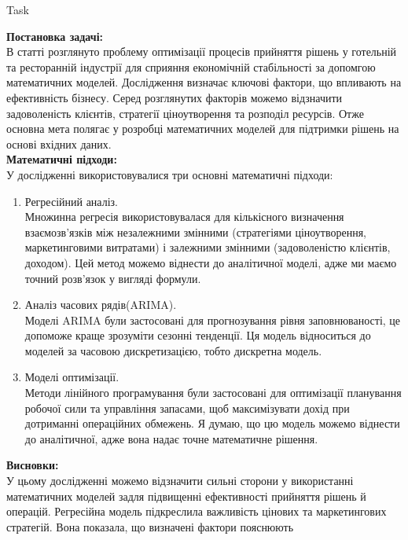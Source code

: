 \documentclass[a4paper,12pt]{article}
\newcommand{\RomanNumeralCaps}[1]{\MakeUppercase{\romannumeral #1}}
\begin{document}
\newpage
    \begin{center}
        \Large{Task \RomanNumeralCaps{1}}
    \end{center}
    \textbf{Постановка задачі:} \\
    В статті розглянуто проблему оптимізації процесів прийняття рішень у готельній та ресторанній індустрії для сприяння 
    економічній стабільності за допомгою математичних моделей.  
    Дослідження визначає ключові фактори, що впливають на ефективність бізнесу. Серед розглянутих факторів можемо відзначити задоволеність 
    клієнтів, стратегії ціноутворення та розподіл ресурсів. Отже основна мета полягає у розробці математичних моделей для підтримки рішень на основі вхідних даних. \\
    \textbf{Математичні підходи:} \\
    У дослідженні використовувалися три основні математичні підходи:
    \begin{enumerate}
        \item Регресійний аналіз. \\
        Множинна регресія використовувалася для кількісного визначення взаємозв’язків між незалежними змінними 
        (стратегіями ціноутворення, маркетинговими витратами) і залежними змінними (задоволеністю клієнтів, доходом).
        Цей метод можемо віднести до аналітичної моделі, адже ми маємо точний розв'язок у вигляді формули.
        \item Аналіз часових рядів(ARIMA). \\
        Моделі ARIMA були застосовані для прогнозування рівня заповнюваності, це допоможе краще зрозуміти сезонні тенденції.
        Ця модель відноситься до моделей за часовою дискретизацією, тобто дискретна модель.
        \item Моделі оптимізації. \\ 
        Методи лінійного програмування були застосовані для оптимізації планування робочої сили та управління запасами, 
        щоб максимізувати дохід при дотриманні операційних обмежень.
        Я думаю, що цю модель можемо віднести до аналітичної, адже вона надає точне математичне рішення.
    \end{enumerate}
    \textbf{Висновки:} \\
    У цьому дослідженні можемо відзначити сильні сторони у використанні математичних моделей задля підвищенні ефективності прийняття рішень й операцій. 
    Регресійна модель підкреслила важливість цінових та маркетингових стратегій. Вона показала, що визначені фактори пояснюють 
\end{document}
